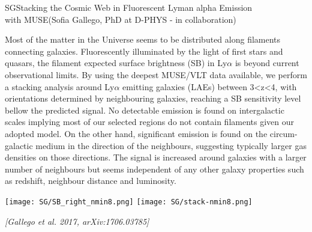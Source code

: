 \begin{section}{SG}{Stacking the Cosmic Web in Fluorescent Lyman alpha Emission
    \\ \hspace*{4cm} with MUSE}{(Sofia Gallego, PhD at D-PHYS - in collaboration)}
  \begin{minipage}[l]{\textwidth}

    {\small Most of the matter in the Universe seems to be distributed along
      filaments connecting galaxies. Fluorescently illuminated by the light of
      first stars and quasars, the filament expected surface brightness (SB) in
      Ly$\alpha$ is beyond current observational limits. By using the deepest
      MUSE/VLT data available, we perform a stacking analysis around Ly$\alpha$
      emitting galaxies (LAEs) between 3<z<4, with orientations determined by
      neighbouring galaxies, reaching a SB sensitivity level bellow the
      predicted signal. No detectable emission is found on intergalactic
      scales implying most of our selected regions do not contain filaments
      given our adopted model. On the other hand, significant emission is
      found on the circum-galactic medium in the direction of the neighbours,
      suggesting typically larger gas densities on those directions. The
      signal is increased around galaxies with a larger number of neighbours
      but seems independent of any other galaxy properties such as redshift,
      neighbour distance and luminosity.}
  \end{minipage}

  \vspace{0.5cm}

  \begin{minipage}{\linewidth}
    \begin{center}
      \texttt{[image: SG/SB\_right\_nmin8.png]}
      \texttt{[image: SG/stack-nmin8.png]}
    \end{center}
  \end{minipage}

  \vspace{0.5cm}

  {\footnotesize \textit{[Gallego et al. 2017, arXiv:1706.03785]}}
\end{section}